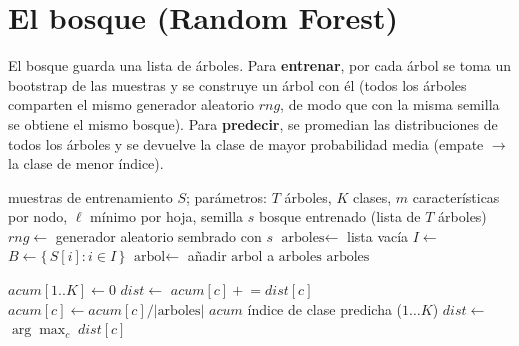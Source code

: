 \documentclass[11pt,a4paper]{article}
\begin{document}
\section{El bosque (Random Forest)}

El bosque guarda una lista de árboles. Para \textbf{entrenar}, por cada árbol se toma un
bootstrap de las muestras y se construye un árbol con él (todos los árboles comparten el mismo
generador aleatorio $\mathit{rng}$, de modo que con la misma semilla se obtiene el mismo
bosque). Para \textbf{predecir}, se promedian las distribuciones de todos los árboles y se
devuelve la clase de mayor probabilidad media (empate $\to$ la clase de menor índice).

\begin{algorithm}[h]
\caption{Entrenamiento del bosque}
\begin{algorithmic}[1]
  \Require muestras de entrenamiento $S$; parámetros: $T$ árboles, $K$ clases,
           $m$ características por nodo, $\ell$ mínimo por hoja, semilla $s$
  \Ensure bosque entrenado (lista de $T$ árboles)
  \State $\mathit{rng} \gets$ generador aleatorio sembrado con $s$
  \State $\text{arboles} \gets$ lista vacía
     \State $I \gets$ 
     \State $B \gets \{\, S[i] : i \in I \,\}$
     \State $\text{arbol} \gets$ 
     \State añadir $\text{arbol}$ a $\text{arboles}$
  \EndFor
  \State \Return $\text{arboles}$
\EndFunction
\end{algorithmic}
\end{algorithm}

\begin{algorithm}[h]
\caption{Predicción del bosque (voto blando)}
\begin{algorithmic}[1]
  \State $\mathit{acum}[1..K] \gets 0$
     \State $\mathit{dist} \gets$ 
        \State $\mathit{acum}[c] \mathrel{+}= \mathit{dist}[c]$
     \EndFor
  \EndFor
     \State $\mathit{acum}[c] \gets \mathit{acum}[c] / |\text{arboles}|$
  \EndFor
  \State \Return $\mathit{acum}$
\EndFunction
\Statex
{}
  \Ensure índice de clase predicha ($1 \ldots K$)
  \State $\mathit{dist} \gets$ 
  \State \Return $\arg\max_c \; \mathit{dist}[c]$
\EndFunction
\end{algorithmic}
\end{algorithm}
\end{document}

